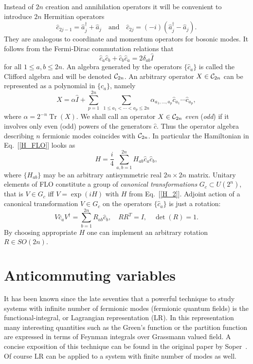 \documentclass[twocolumn,showpacs,preprintnumbers,superscriptaddress]{revtex4}
\newcommand{\Clif}{{\cal C}}
\newcommand{\be}{\begin{equation}}
\newcommand{\ee}{\end{equation}}
\newcommand{\aop}{{\hat{a}}}
\newcommand{\cop}{{\hat{c}}}
\newcommand{\Iop}{{\hat{I}}}
\DeclareMathOperator*{\tr}{\mathop{\mathrm{Tr}}}
\begin{document}
Instead of $2n$ creation and annihilation operators it will be convenient
to introduce $2n$  Hermitian operators
\be\label{majorana}
\cop_{2j-1} = \aop_j^\dag + \aop_j \quad \mbox{and} \quad
\cop_{2j}=(-i)(\aop_j^\dag - \aop_j).
\ee
They are analogous to coordinate and momentum operators for bosonic 
modes. It follows from the Fermi-Dirac commutation relations that
\be\label{Clifford}
\cop_a \cop_b + \cop_b \cop_a = 2\delta_{ab} \Iop
\ee
for all $1\le a,b \le 2n$. An algebra generated by the operators $\{\cop_a\}$
is called the Clifford algebra and will be denoted $\Clif_{2n}$. An arbitrary
operator $X\in \Clif_{2n}$ can be represented as a polynomial in $\{\cop_a\}$, namely
\[
X= \alpha \Iop + \sum_{p=1}^{2n}\;  \sum_{1\le a_1<\cdots <a_p\le 2n}
\alpha_{a_1,\ldots,a_p} \cop_{a_1}\cdots \cop_{a_p},
\]
where $\alpha=2^{-n}\tr{(X)}$.
We shall call an operator $X\in \Clif_{2n}$ {\it even} ({\it odd}) if it involves only
even (odd) powers of the generators  $\cop$.
Thus the operator algebra describing $n$ fermionic modes coincides with $\Clif_{2n}$.
In particular the Hamiltonian in Eq.~[\ref{H_FLO}] looks as
\be\label{H_2}
H = \frac{i}4 \, \sum_{a,b=1}^{2n} H_{ab} \cop_a \cop_b,
\ee
where $\{H_{ab}\}$ may be an arbitrary antisymmetric real $2n\times 2n$ matrix.
Unitary elements of FLO constitute a group of {\it canonical transformations}
$G_c\subset U(2^n)$, that is $V\in G_c$ iff $V=\exp{(iH)}$ with $H$ from Eq.~[\ref{H_2}].
Adjoint action of a canonical transformation $V\in G_c$ on the operators $\{\cop_a\}$
is just a rotation:
\be\label{rotation}
V \cop_a V^\dag = \sum_{b=1}^{2n} R_{ab} \cop_b, \quad
RR^T =I, \quad \det{(R)}=1.
\ee
By choosing appropriate $H$ one can implement an arbitrary rotation $R\in SO(2n)$.



\section{Anticommuting variables}\label{sec:Grassmann}

It has been known since the late seventies that a powerful technique to study
systems with infinite number of fermionic modes (fermionic quantum fields)
is the functional-integral, or Lagrangian representation (LR). In this representation
many  interesting quantities such as the Green's function or the partition function
are expressed in terms of Feynman integrals over Grassmann valued field.
A concise exposition of this technique can be found in the original
paper by Soper~\cite{Soper78}. Of course  LR can be
applied to a system  with finite number of modes as well. 
\end{document}
